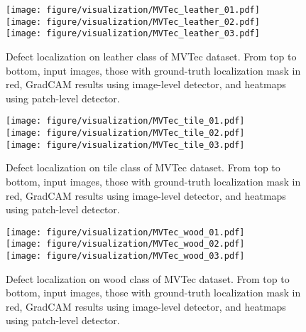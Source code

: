 \documentclass[final]{cvpr}
\begin{document}
\begin{figure}
    \centering
    \texttt{[image: figure/visualization/MVTec\_leather\_01.pdf]}\\
    \vspace{0.05in}
    \texttt{[image: figure/visualization/MVTec\_leather\_02.pdf]}\\
    \vspace{0.05in}
    \texttt{[image: figure/visualization/MVTec\_leather\_03.pdf]}
    \caption{Defect localization on leather class of MVTec dataset. From top to bottom, input images, those with ground-truth localization mask in red, GradCAM results using image-level detector, and heatmaps using patch-level detector.}
    \label{fig:heatmap_leather}
\end{figure}

\begin{figure}
    \centering
    \texttt{[image: figure/visualization/MVTec\_tile\_01.pdf]}\\
    \vspace{0.05in}
    \texttt{[image: figure/visualization/MVTec\_tile\_02.pdf]}\\
    \vspace{0.05in}
    \texttt{[image: figure/visualization/MVTec\_tile\_03.pdf]}
    \caption{Defect localization on tile class of MVTec dataset. From top to bottom, input images, those with ground-truth localization mask in red, GradCAM results using image-level detector, and heatmaps using patch-level detector.}
    \label{fig:heatmap_tile}
\end{figure}

\begin{figure}
    \centering
    \texttt{[image: figure/visualization/MVTec\_wood\_01.pdf]}\\
    \vspace{0.05in}
    \texttt{[image: figure/visualization/MVTec\_wood\_02.pdf]}\\
    \vspace{0.05in}
    \texttt{[image: figure/visualization/MVTec\_wood\_03.pdf]}
    \caption{Defect localization on wood class of MVTec dataset. From top to bottom, input images, those with ground-truth localization mask in red, GradCAM results using image-level detector, and heatmaps using patch-level detector.}
    \label{fig:heatmap_wood}
\end{figure}
\end{document}
